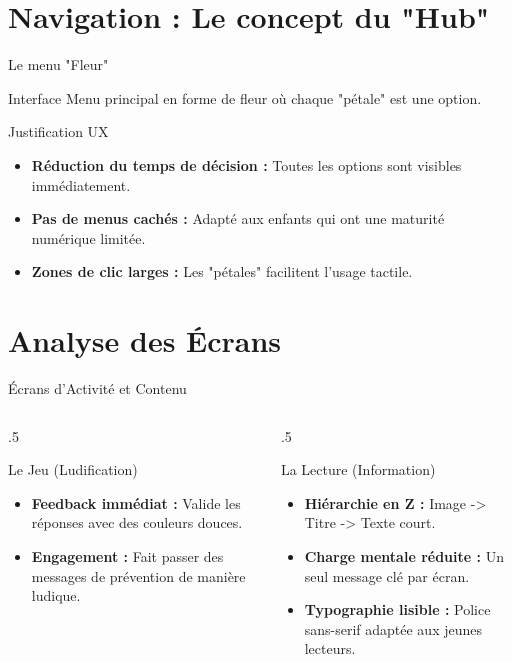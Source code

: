 \documentclass[10pt, aspectratio=169]{beamer}
\let\oldtextbf\textbf
\renewcommand{\textbf}[1]{{\color{strongBlue}\oldtextbf{#1}}}
\begin{document}
\section{Navigation : Le concept du "Hub"}
\begin{frame}{Le menu "Fleur"}
    \begin{block}{Interface}
        Menu principal en forme de fleur où chaque "pétale" est une option.
    \end{block}
    
    \begin{alertblock}{Justification UX}
        \begin{itemize}
            \item \textbf{Réduction du temps de décision :} Toutes les options sont visibles immédiatement.
            \item \textbf{Pas de menus cachés :} Adapté aux enfants qui ont une maturité numérique limitée.
            \item \textbf{Zones de clic larges :} Les "pétales" facilitent l'usage tactile.
        \end{itemize}
    \end{alertblock}
\end{frame}

\section{Analyse des Écrans}
\begin{frame}{Écrans d'Activité et Contenu}
    \begin{columns}[T]
        \begin{column}{.5\textwidth}
            \begin{block}{Le Jeu (Ludification)}
                \begin{itemize}
                    \item \textbf{Feedback immédiat :} Valide les réponses avec des couleurs douces.
                    \item \textbf{Engagement :} Fait passer des messages de prévention de manière ludique.
                \end{itemize}
            \end{block}
        \end{column}
        \begin{column}{.5\textwidth}
            \begin{block}{La Lecture (Information)}
                \begin{itemize}
                    \item \textbf{Hiérarchie en Z :} Image -> Titre -> Texte court.
                    \item \textbf{Charge mentale réduite :} Un seul message clé par écran.
                    \item \textbf{Typographie lisible :} Police sans-serif adaptée aux jeunes lecteurs.
                \end{itemize}
            \end{block}
        \end{column}
    \end{columns}
\end{frame}
\end{document}

